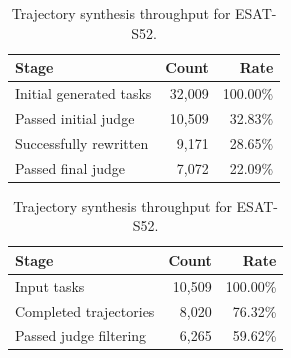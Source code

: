 \begin{table}[t]
\centering
\small
\begin{minipage}[t]{0.49\linewidth}
    \centering
    \begin{tabular}{lrr}
    \toprule
    \textbf{Stage} & \textbf{Count} & \textbf{Rate} \\
    \midrule
    Initial generated tasks & 32,009 & 100.00\% \\
    Passed initial judge & 10,509 & 32.83\% \\
    Successfully rewritten & 9,171 & 28.65\% \\
    Passed final judge & 7,072 & 22.09\% \\
    \bottomrule
    \end{tabular}
    \caption{Task synthesis throughput for ESAT-S52.}
    \label{tab:syn_task_synthesis_stats}
\end{minipage}
\hfill
\begin{minipage}[t]{0.49\linewidth}
    \centering
    \begin{tabular}{lrr}
    \toprule
    \textbf{Stage} & \textbf{Count} & \textbf{Rate} \\
    \midrule
    Input tasks & 10,509 & 100.00\% \\
    Completed trajectories &  8,020 & 76.32\% \\
    Passed judge filtering  & 6,265 & 59.62\% \\
    \bottomrule
    \end{tabular}
    \caption{Trajectory synthesis throughput for \textsc{ESAT}-S52.}
    \label{tab:syn_traj_througput}
\end{minipage}
\end{table}
